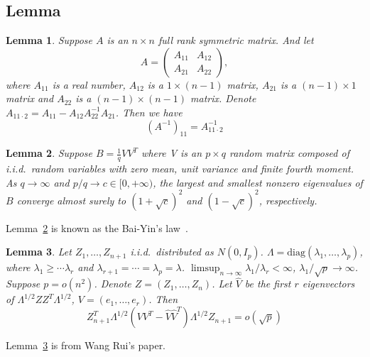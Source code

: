 \documentclass[review]{elsarticle}
\theoremstyle{plain}
\newtheorem{lemma}{Lemma}
\theoremstyle{definition}
\theoremstyle{remark}
\begin{document}
\subsection{Lemma}

\begin{lemma}\label{matrixInv}
    Suppose $A$ is an $n\times n$ full rank symmetric matrix. And let 
    \begin{equation}
        A=\begin{pmatrix}
            A_{11} & A_{12}\\
            A_{21} & A_{22}
        \end{pmatrix},
    \end{equation}
    where $A_{11}$ is a real number, $A_{12}$ is a $1\times (n-1)$ matrix, $A_{21}$ is a $(n-1)\times 1$ matrix and $A_{22}$ is a $(n-1)\times (n-1)$ matrix. Denote $A_{11\cdot 2}=A_{11}-A_{12}A_{22}^{-1}A_{21}$. Then we have
    \begin{equation}
        {(A^{-1})}_{11}=A_{11\cdot 2}^{-1}
    \end{equation}
\end{lemma}

\begin{lemma}\label{baiyin}
    Suppose $B=\frac{1}{q}V V^T$ where V is an $p\times q$ random matrix composed of i.i.d.\  random variables with zero mean, unit variance and finite fourth moment. As $q\to \infty$ and $p/q \to c\in [0,+\infty)$, the largest and smallest nonzero eigenvalues of $B$ converge almost surely to ${(1+\sqrt{c})}^2$ and ${(1-\sqrt{c})}^2$, respectively.
\end{lemma}
Lemma~\ref{baiyin} is known as the Bai-Yin's law~\cite{Bai1993Limit}.

\begin{lemma}\label{wangPCA}
    Let $Z_1,\ldots,Z_{n+1}$ i.i.d.\ distributed as $N(0,I_p)$.
    $\Lambda=\textrm{diag}(\lambda_1,\ldots,\lambda_p)$, where $\lambda_1\geq \cdots \lambda_r$ and $\lambda_{r+1}=\cdots =\lambda_p=\lambda$.
    $\limsup_{n\to \infty} \lambda_1/\lambda_r<\infty$, $\lambda_1/\sqrt{p}\to \infty$.
    Suppose $p=o(n^2)$.
    Denote $Z=(Z_1,\ldots,Z_n)$. Let $\hat{V}$ be the first $r$ eigenvectors of $\Lambda^{1/2}Z Z^T\Lambda^{1/2}$, $V=(e_1,\ldots,e_r)$. Then
    \begin{equation}
        Z_{n+1}^T \Lambda^{1/2}(VV^T -\hat{V}\hat{V}^T)\Lambda^{1/2}Z_{n+1}=o(\sqrt{p})
    \end{equation}
\end{lemma}
Lemma~\ref{wangPCA} is from Wang Rui's paper.
\end{document}

